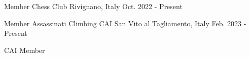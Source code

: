 

\begin{cventries}

  \cventry
    {Member} %
    {Chess Club} %
    {Rivignano, Italy} %
    {Oct. 2022 - Present} %
    {
    }

  \cventry
    {Member} %
    {Assassinati Climbing CAI } %
    {San Vito al Tagliamento, Italy} %
    {Feb. 2023 - Present} %
    {
    \begin{cvitems} %
        \item {CAI Member}
      \end{cvitems}
    }


\end{cventries}

